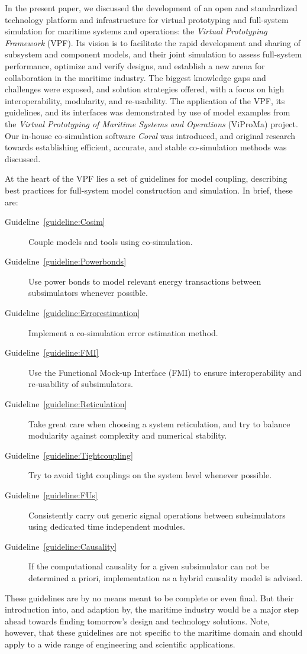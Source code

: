 \documentclass[prb,aps,showpacs,floatfix,twocolumn,10pt]{revtex4-1}
\newcommand{\sub}{subsimulator}
\newcommand{\guidelineCosimshort}{%
	Couple models and tools using co-simulation.
}
\newcommand{\guidelinePowerbondsshort}{%
	Use power bonds to model relevant energy transactions between \sub{}s whenever possible.
}
\newcommand{\guidelineErrorestimationshort}{%
	Implement a co-simulation error estimation method.
}
\newcommand{\guidelineFMIshort}{%
	Use the Functional Mock-up Interface (FMI) to ensure interoperability and re-usability of \sub{}s.
}
\newcommand{\guidelineFUsshort}{%
	Consistently carry out generic signal operations between \sub{}s using dedicated time independent modules.
}
\newcommand{\guidelineReticulationshort}{%
	Take great care when choosing a system reticulation, and try to balance modularity against complexity and numerical stability.
}
\newcommand{\guidelineTightcouplingshort}{%
	Try to avoid tight couplings on the system level whenever possible.
}
\newcommand{\guidelineCausalityshort}{%
	If the computational causality for a given \sub{} can not be determined a priori, implementation as a hybrid causality model is advised.
}
\theoremstyle{plain}
\theoremstyle{remark}
\begin{document}
In the present paper, we discussed the development of an open and standardized technology platform and infrastructure for virtual prototyping and full-system simulation for maritime systems and operations: the \emph{Virtual Prototyping Framework} (VPF).
Its vision is to facilitate the rapid development and sharing of subsystem and component models, and their joint simulation to assess full-system performance, optimize and verify designs, and establish a new arena for collaboration in the maritime industry.
The biggest knowledge gaps and challenges were exposed, and solution strategies offered, with a focus on high interoperability, modularity, and re-usability.
The application of the VPF, its guidelines, and its interfaces was demonstrated by use of model examples from the \emph{Virtual Prototyping of Maritime Systems and Operations}\cite{VIPROMA-website} (ViProMa) project.
Our in-house co-simulation software \emph{Coral} was introduced, and original research towards establishing efficient, accurate, and stable co-simulation methods was discussed.

At the heart of the VPF lies a set of guidelines for model coupling, describing best practices for full-system model construction and simulation.
In brief, these are:
\begin{description}
\item[Guideline~\ref{guideline:Cosim}]
	\guidelineCosimshort{}
\item[Guideline~\ref{guideline:Powerbonds}]
	\guidelinePowerbondsshort{}
\item[Guideline~\ref{guideline:Errorestimation}]
	\guidelineErrorestimationshort{}
\item[Guideline~\ref{guideline:FMI}]
	\guidelineFMIshort{}
\item[Guideline~\ref{guideline:Reticulation}]
	\guidelineReticulationshort{}
\item[Guideline~\ref{guideline:Tightcoupling}]
	\guidelineTightcouplingshort{}
\item[Guideline~\ref{guideline:FUs}]
	\guidelineFUsshort{}
\item[Guideline~\ref{guideline:Causality}]
	\guidelineCausalityshort{}
\end{description}
These guidelines are by no means meant to be complete or even final.
But their introduction into, and adaption by, the maritime industry would be a major step ahead towards finding tomorrow's design and technology solutions.
Note, however, that these guidelines are not specific to the maritime domain and should apply to a wide range of engineering and scientific applications.
\end{document}
